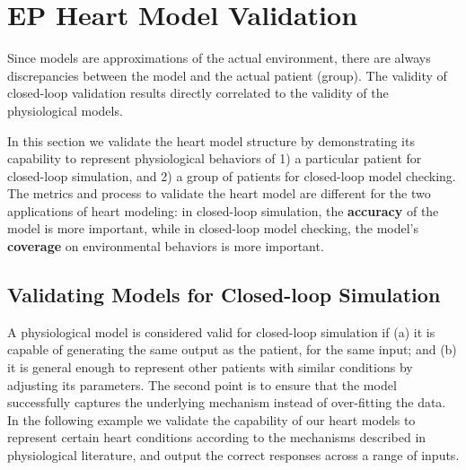 \section{EP Heart Model Validation}
Since models are approximations of the actual environment, there are always discrepancies between the model and the actual patient (group). 
The validity of closed-loop validation results directly correlated to the validity of the physiological models.

In this section we validate the heart model structure by demonstrating its capability to represent physiological behaviors of 1) a particular patient for closed-loop simulation, and 2) a group of patients for closed-loop model checking.
The metrics and process to validate the heart model are different for the two applications of heart modeling: in closed-loop simulation, the \textbf{accuracy} of the model is more important, while in closed-loop model checking, the model's \textbf{coverage} on environmental behaviors is more important.



\subsection{Validating Models for Closed-loop Simulation}
A physiological model is considered valid for closed-loop simulation if (a) it is capable of generating the same output as the patient, for the same input; and (b) it is general enough to represent other patients with similar conditions by adjusting its parameters. The second point is to ensure that the model successfully captures the underlying mechanism instead of over-fitting the data. In the following example we validate the capability of our heart models to represent certain heart conditions according to the mechanisms described in physiological literature, and  output the correct responses across a range of inputs.\\

